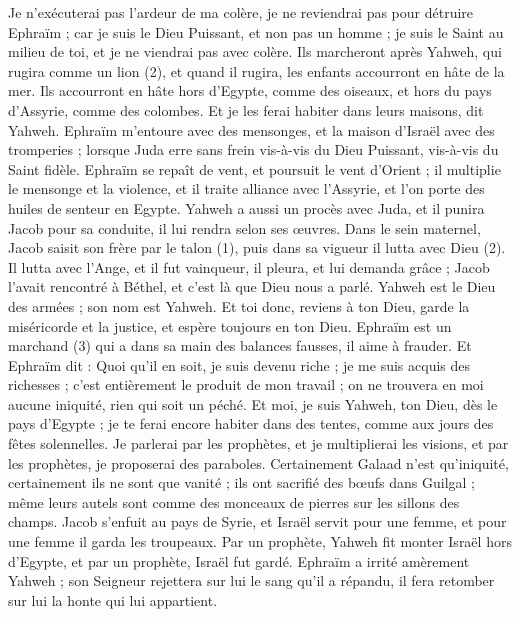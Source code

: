 \begin{multicols}{2}
Je n'exécuterai pas l'ardeur de ma colère, je ne reviendrai pas pour détruire Ephraïm ; car je suis le Dieu Puissant, et non pas un homme ; je suis le Saint au milieu de toi, et je ne viendrai pas avec colère.
Ils marcheront après Yahweh, qui rugira comme un lion (2), et quand il rugira, les enfants accourront en hâte de la mer.
Ils accourront en hâte hors d'Egypte, comme des oiseaux, et hors du pays d'Assyrie, comme des colombes. Et je les ferai habiter dans leurs maisons, dit Yahweh.
\VerseOne{}Ephraïm m'entoure avec des mensonges, et la maison d'Israël avec des tromperies ; lorsque Juda erre sans frein vis-à-vis du Dieu Puissant, vis-à-vis du Saint fidèle.
Ephraïm se repaît de vent, et poursuit le vent d'Orient ; il multiplie le mensonge et la violence, et il traite alliance avec l'Assyrie, et l'on porte des huiles de senteur en Egypte.
Yahweh a aussi un procès avec Juda, et il punira Jacob pour sa conduite, il lui rendra selon ses œuvres.
Dans le sein maternel, Jacob saisit son frère par le talon (1), puis dans sa vigueur il lutta avec Dieu (2).
Il lutta avec l’Ange, et il fut vainqueur, il pleura, et lui demanda grâce ; Jacob l’avait rencontré à Béthel, et c’est là que Dieu nous a parlé.
Yahweh est le Dieu des armées ; son nom est Yahweh.
Et toi donc, reviens à ton Dieu, garde la miséricorde et la justice, et espère toujours en ton Dieu.
Ephraïm est un marchand (3) qui a dans sa main des balances fausses, il aime à frauder.
Et Ephraïm dit : Quoi qu'il en soit, je suis devenu riche ; je me suis acquis des richesses ; c’est entièrement le produit de mon travail ; on ne trouvera en moi aucune iniquité, rien qui soit un péché.
Et moi, je suis Yahweh, ton Dieu, dès le pays d'Egypte ; je te ferai encore habiter dans des tentes, comme aux jours des fêtes solennelles.
Je parlerai par les prophètes, et je multiplierai les visions, et par les prophètes, je proposerai des paraboles.
Certainement Galaad n'est qu'iniquité, certainement ils ne sont que vanité ; ils ont sacrifié des bœufs dans Guilgal ; même leurs autels sont comme des monceaux de pierres sur les sillons des champs.
Jacob s'enfuit au pays de Syrie, et Israël servit pour une femme, et pour une femme il garda les troupeaux.
Par un prophète, Yahweh fit monter Israël hors d'Egypte, et par un prophète, Israël fut gardé.
Ephraïm a irrité amèrement Yahweh ; son Seigneur rejettera sur lui le sang qu’il a répandu, il fera retomber sur lui la honte qui lui appartient.

\end{multicols}
